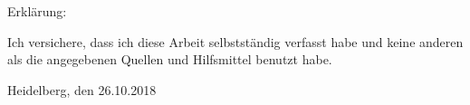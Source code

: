 \newpage
\thispagestyle{empty}
\clearpage\mbox{}\clearpage

\setlength{\parindent}{0em}
\thispagestyle{empty}

Erkl\"{a}rung:\par
\vspace{3\baselineskip}
Ich versichere, dass ich diese Arbeit selbstst\"{a}ndig verfasst habe und keine
anderen als die angegebenen Quellen und Hilfsmittel benutzt habe.\par
\vspace{5\baselineskip}
Heidelberg, den 26.10.2018\hspace{3cm}\dotfill
